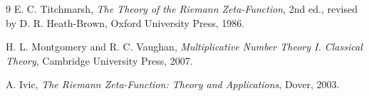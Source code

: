 \documentclass[11pt]{article}
\theoremstyle{plain}
\theoremstyle{definition}
\begin{document}
\begin{thebibliography}{9}
E. C. Titchmarsh,
\emph{The Theory of the Riemann Zeta-Function},
2nd ed., revised by D. R. Heath-Brown, Oxford University Press, 1986.

H. L. Montgomery and R. C. Vaughan,
\emph{Multiplicative Number Theory I. Classical Theory},
Cambridge University Press, 2007.

A. Ivic,
\emph{The Riemann Zeta-Function: Theory and Applications},
Dover, 2003.

\end{thebibliography}
\end{document}
